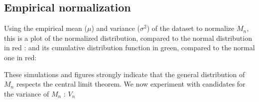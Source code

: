    
    		
       
    

	\subsection{Empirical normalization}
 Using the empirical mean ($\mu$) and variance ($\sigma^2$) of the dataset to normalize $M_n$,
 this is a plot of the normalized distribution, compared to the normal distribution 
 in red :
	\noindent
	 and its cumulative distribution function in green, compared to the normal one in red:
	
	These simulations and figures strongly indicate that the general distribution
	of $M_n$ respects the central limit theorem. We now experiment with
	candidates for the variance of $M_n$ : $V_n$

	
